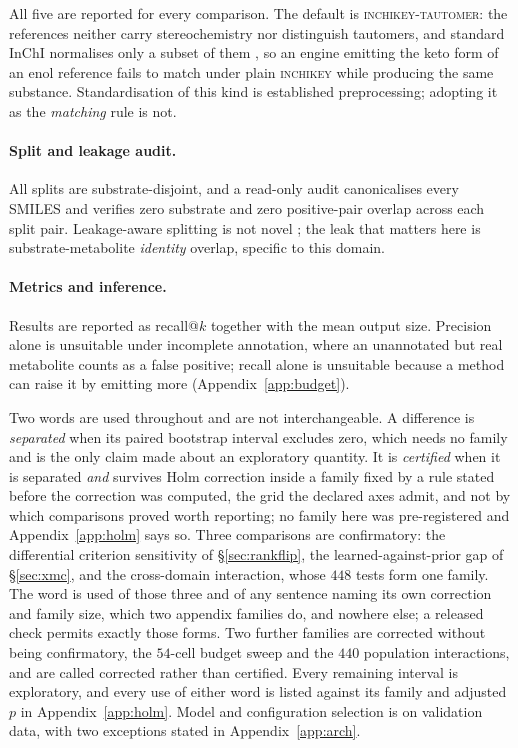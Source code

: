 All five are reported for every comparison. The default is \textsc{inchikey-tautomer}: the references
neither carry stereochemistry nor distinguish tautomers, and standard InChI normalises only a subset
of them \citep{Dhaked_2020}, so an engine emitting the keto form of an enol reference fails to match
under plain \textsc{inchikey} while producing the same substance. Standardisation of
this kind is established preprocessing; adopting it as the \emph{matching} rule is not.

\paragraph{Split and leakage audit.} All splits are substrate-disjoint, and a read-only audit
canonicalises every SMILES and verifies zero substrate and zero positive-pair overlap across each
split pair. Leakage-aware splitting is not novel \citep{Joeres_2025}; the leak that matters here is
substrate-metabolite \emph{identity} overlap, specific to this domain.

\paragraph{Metrics and inference.} Results are reported as recall@$k$ together with the mean output
size. Precision alone is unsuitable under incomplete annotation, where an unannotated but real
metabolite counts as a false positive; recall alone is unsuitable because a method can raise it by
emitting more (Appendix~\ref{app:budget}).

Two words are used throughout and are not interchangeable. A difference is \emph{separated} when its
paired bootstrap interval excludes zero, which needs no family and is the only claim made about an
exploratory quantity. It is \emph{certified} when it is separated \emph{and} survives Holm
correction inside a family fixed by a rule stated before the correction was computed, the grid the
declared axes admit, and not by which comparisons proved worth reporting; no family here was
pre-registered and Appendix~\ref{app:holm} says so. Three comparisons are confirmatory: the
differential criterion sensitivity of \S\ref{sec:rankflip}, the learned-against-prior gap of
\S\ref{sec:xmc}, and the cross-domain interaction, whose $448$ tests form one family. The word is used of those three and of any sentence
naming its own correction and family size, which two appendix families do, and nowhere else; a
released check permits exactly those forms. Two further families are corrected without being
confirmatory, the $54$-cell budget sweep and the $440$ population interactions, and are called
corrected rather than certified. Every remaining interval is exploratory, and every use of either
word is listed against its family and adjusted $p$ in Appendix~\ref{app:holm}. Model and
configuration selection is on validation data, with two exceptions stated in
Appendix~\ref{app:arch}.


